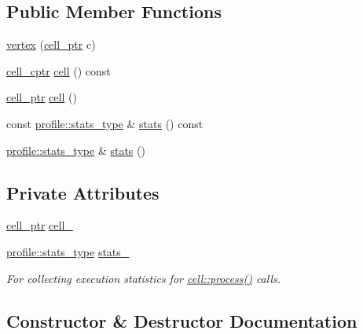 \subsection*{Public Member Functions}
\begin{DoxyCompactItemize}
\item 
\hyperlink{classecto_1_1graph_1_1vertex_a18cea5500866c9d86ce252e84d3881c6}{vertex} (\hyperlink{namespaceecto_aed1809e82b9229ea81ef9ee3438cf62c}{cell\+\_\+ptr} c)
\item 
\hyperlink{namespaceecto_ab708c826226c91fd6f3c8c121f293a78}{cell\+\_\+cptr} \hyperlink{classecto_1_1graph_1_1vertex_aa5876238d51eb82bed7a17414bd74132}{cell} () const 
\item 
\hyperlink{namespaceecto_aed1809e82b9229ea81ef9ee3438cf62c}{cell\+\_\+ptr} \hyperlink{classecto_1_1graph_1_1vertex_a7b2bed5e1305cc26855c5bc8bc6884df}{cell} ()
\item 
const \hyperlink{structecto_1_1profile_1_1stats__type}{profile\+::stats\+\_\+type} \& \hyperlink{classecto_1_1graph_1_1vertex_a38bfe554aa3f8413769be22dff0ea2c3}{stats} () const 
\item 
\hyperlink{structecto_1_1profile_1_1stats__type}{profile\+::stats\+\_\+type} \& \hyperlink{classecto_1_1graph_1_1vertex_a522f60e25aa0d769b3826911e0c69d6f}{stats} ()
\end{DoxyCompactItemize}
\subsection*{Private Attributes}
\begin{DoxyCompactItemize}
\item 
\hyperlink{namespaceecto_aed1809e82b9229ea81ef9ee3438cf62c}{cell\+\_\+ptr} \hyperlink{classecto_1_1graph_1_1vertex_a14485eadc4288f5d4e5e32e6b5218ec7}{cell\+\_\+}
\item 
\hyperlink{structecto_1_1profile_1_1stats__type}{profile\+::stats\+\_\+type} \hyperlink{classecto_1_1graph_1_1vertex_abf79016904200297ba32e42534c8ac53}{stats\+\_\+}
\begin{DoxyCompactList}\small\item\em For collecting execution statistics for \hyperlink{structecto_1_1cell_a6b810671ee21f5dddbc1206abfb999f3}{cell\+::process()} calls. \end{DoxyCompactList}\end{DoxyCompactItemize}


\subsection{Constructor \& Destructor Documentation}
